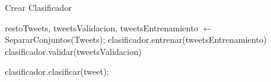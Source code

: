 \begin{algorithm}
	\caption{Crear Clasificador}\label{CrearClasificador}
	\begin{algorithmic}[1]
		\State restoTweets, tweetsValidacion, tweetsEntrenamiento $\gets$ SepararConjuntos(Tweets);
		\State clasificador.entrenar(tweetsEntrenamiento)
		\State clasificador.validar(tweetsValidacion)
		
			 \State clasificador.clasificar(tweet);
		\EndFor
		\EndFunction
	\end{algorithmic}
\end{algorithm}

